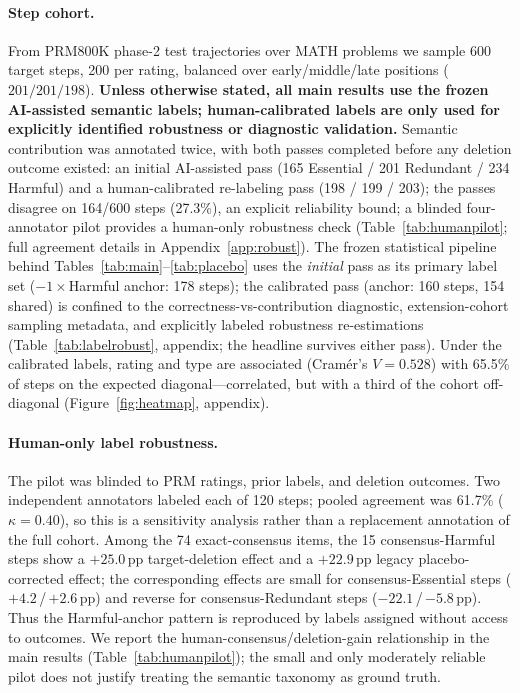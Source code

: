 \documentclass[11pt]{article}
\begin{document}
\paragraph{Step cohort.}
From PRM800K phase-2 test trajectories \citep{lightman2024lets} over MATH problems \citep{hendrycks2021measuring} we sample 600 target steps, 200 per rating, balanced over early/middle/late positions ($201/201/198$). \textbf{Unless otherwise stated, all main results use the frozen AI-assisted semantic labels; human-calibrated labels are only used for explicitly identified robustness or diagnostic validation.} Semantic contribution was annotated twice, with both passes completed before any deletion outcome existed: an initial AI-assisted pass (165 Essential / 201 Redundant / 234 Harmful) and a human-calibrated re-labeling pass (198 / 199 / 203); the passes disagree on 164/600 steps (27.3\%), an explicit reliability bound; a blinded four-annotator pilot provides a human-only robustness check (Table~\ref{tab:humanpilot}; full agreement details in Appendix~\ref{app:robust}). The frozen statistical pipeline behind Tables~\ref{tab:main}--\ref{tab:placebo} uses the \emph{initial} pass as its primary label set ($-1\times$Harmful anchor: 178 steps); the calibrated pass (anchor: 160 steps, 154 shared) is confined to the correctness-vs-contribution diagnostic, extension-cohort sampling metadata, and explicitly labeled robustness re-estimations (Table~\ref{tab:labelrobust}, appendix; the headline survives either pass). Under the calibrated labels, rating and type are associated (Cram\'er's $V = 0.528$) with 65.5\% of steps on the expected diagonal---correlated, but with a third of the cohort off-diagonal (Figure~\ref{fig:heatmap}, appendix).

\paragraph{Human-only label robustness.}
The pilot was blinded to PRM ratings, prior labels, and deletion outcomes. Two independent annotators labeled each of 120 steps; pooled agreement was 61.7\% ($\kappa=0.40$), so this is a sensitivity analysis rather than a replacement annotation of the full cohort. Among the 74 exact-consensus items, the 15 consensus-Harmful steps show a $+25.0$\,pp target-deletion effect and a $+22.9$\,pp legacy placebo-corrected effect; the corresponding effects are small for consensus-Essential steps ($+4.2$\,/\,$+2.6$\,pp) and reverse for consensus-Redundant steps ($-22.1$\,/\,$-5.8$\,pp). Thus the Harmful-anchor pattern is reproduced by labels assigned without access to outcomes. We report the human-consensus/deletion-gain relationship in the main results (Table~\ref{tab:humanpilot}); the small and only moderately reliable pilot does not justify treating the semantic taxonomy as ground truth.
\end{document}
